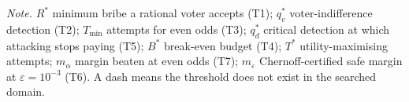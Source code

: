 \begin{table}[htbp]
\centering
\caption{Critical thresholds for the five benchmark scenarios under the baseline configuration.}
\label{tab:thresholds}
\small
{}
\vspace{2pt}
{\footnotesize\textit{Note.} $R^*$ minimum bribe a rational voter accepts (T1); $q_v^*$ voter-indifference detection (T2); $T_{\min}$ attempts for even odds (T3); $q_d^*$ critical detection at which attacking stops paying (T5); $B^*$ break-even budget (T4); $T^*$ utility-maximising attempts; $m_\alpha$ margin beaten at even odds (T7); $m_\varepsilon$ Chernoff-certified safe margin at $\varepsilon = 10^{-3}$ (T6). A dash means the threshold does not exist in the searched domain.}
\end{table}
